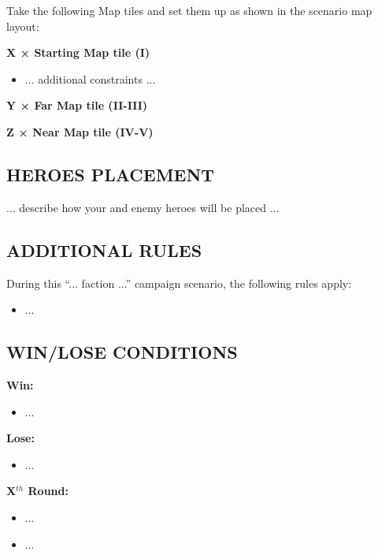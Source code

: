 \begin{multicols*}{2}
Take the following Map tiles and set them up as shown in the scenario map layout:

\textbf{X × Starting Map tile (I)}
\begin{itemize}
    \item ... additional constraints ...
\end{itemize}

\textbf{Y × Far Map tile (II-III)}

\textbf{Z × Near Map tile (IV-V)}

\subsection*{\MakeUppercase{Heroes placement}}

... describe how your and enemy heroes will be placed ...

\subsection*{\MakeUppercase{Additional rules}}

During this ``... faction ...'' campaign scenario, the following rules apply:

\begin{itemize}
    \item ...
\end{itemize}

\subsection*{\MakeUppercase{Win/lose conditions}}

\textbf{Win:}
\begin{itemize}
    \item ...
\end{itemize}

\textbf{Lose:}
\begin{itemize}
    \item ...
\end{itemize}

\textbf{X$^{th}$ Round:}
\begin{itemize}
  \item ...
  \item ...
\end{itemize}

%
%
% 

\end{multicols*}

